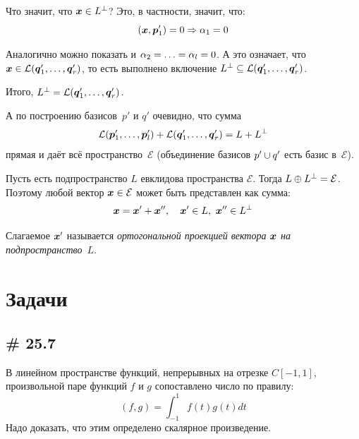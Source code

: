 \documentclass[a4paper,12pt]{article}
\begin{document}
  Что значит, что $\bds x \hm\in L^{\perp}$?
  Это, в частности, значит, что:
  \[
    (\boldsymbol x, \boldsymbol p_1') = 0 \Rightarrow \alpha_1 = 0
  \]
  
  Аналогично можно показать и $\alpha_2 \hm= \ldots \hm= \alpha_l \hm= 0$.
  А это означает, что $\bds x \hm\in \mathcal L(\bds q_1', \ldots, \bds q_r')$,
  то есть выполнено включение $L^{\perp} \hm\subseteq \mathcal L(\bds q_1', \ldots, \bds q_r')$.
  
  Итого, $L^{\perp} \hm= \mathcal L(\bds q_1', \ldots, \bds q_r')$.
  
  А по построению базисов~$p'$ и $q'$ очевидно, что сумма
  \[
    \mathcal L(\bds p_1', \ldots, \bds p_l') \hm+ \mathcal L(\bds q_1', \ldots, \bds q_r') \hm= L \hm+ L^{\perp}
  \]
  прямая и даёт всё пространство~$\mathcal E$ (объединение базисов $p' \hm\cup q'$ есть базис в~$\mathcal E$).
  
  \begin{definition}
    Пусть есть подпространство $L$ евклидова пространства $\mathcal E$.
    Тогда $L \hm\oplus L^{\perp} \hm= \mathcal E$.
    Поэтому любой вектор $\bds x \hm\in \mathcal E$ может быть представлен как сумма:
    \[
      \bds x = \bds x' + \bds x'',\quad \bds x' \in L,\ \bds x'' \in L^{\perp}
    \]
    
    Слагаемое $\boldsymbol x'$ называется \emph{ортогональной проекцией вектора $\boldsymbol x$ на подпространство~$L$}.
  \end{definition}
  
  
  \newpage
  
  \section{Задачи}
  
  \subsection{\# 25.7}
  
  В линейном пространстве функций, непрерывных на отрезке $C[-1, 1]$, произвольной паре функций $f$ и $g$ сопоставлено число по правилу:
  \[
    (f, g) = \int_{-1}^{1} f(t) g(t) dt
  \]
  Надо доказать, что этим определено скалярное произведение.
  
\end{document}
